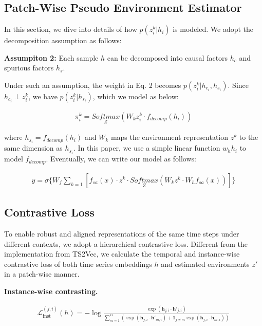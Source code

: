 \subsection{Patch-Wise Pseudo Environment Estimator}
In this section, we dive into details of how \textbf{$p(z^k_i|h_i)$} is modeled. We adopt the decomposition assumption as follows:

\textbf{Assumpiton 2:} Each sample $h$ can be decomposed into causal factors $h_c$ and spurious factors $h_s$.

Under such an assumption, the weight in Eq. 2 becomes $p(z^k_i | h_c_i, h_s_i)$. Since $h_c_i \perp z^k_i$, we have $p(z^k_i | h_s_i)$, which we model as below:

\begin{align}
     \pi_i^k = \underset{Z}{Softmax}(W_k z_i^k \cdot f_{decomp}(h_i))  \tag{3}
\end{align}

where $h_s_i=f_{decomp}(h_i)$ and $W_{k}$ maps the environment representation $z^k$ to the same dimension as $h_s_i$. In this paper, we use a simple linear function $w_h h_i$ to model $f_{decomp}$. Eventually, we can write our model as follows:

{\small
\begin{align}
    y = \sigma \{W_f \sum_{k=1}[f_{sa}(x) \cdot z^k \cdot \underset{Z}{Softmax}(W_k z^k \cdot W_hf_{sa}(x)) ]\} \tag{4}
\end{align}
}



\subsection{Contrastive Loss}
To enable robust and aligned representations of the same time steps under different contexts, we adopt a hierarchical contrastive loss. Different from the implementation from TS2Vec, we calculate the temporal and instance-wise contrastive loss of both time series embeddings $h$ and estimated environments $z'$ in a patch-wise manner.


\textbf{Instance-wise contrasting.}

{\tiny
\begin{align}
\mathcal{L}_{\text{inst}}^{(j, i)}(h) = -\log \frac{\exp \left( \mathbf{h}_{j,i} \cdot \mathbf{h}'_{j,i} \right)}{\sum_{m=1}^B \left( \exp \left( \mathbf{h}_{j,i} \cdot \mathbf{h}'_{m,i} \right) + \mathbb{1}_{j \neq m} \exp \left( \mathbf{h}_{j,i} \cdot \mathbf{h}_{m,i} \right) \right)} \tag{5}
\end{align}
}

